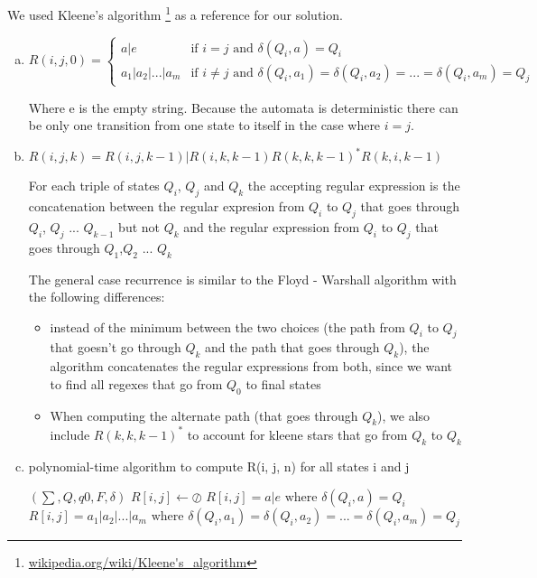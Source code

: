 
We used Kleene's algorithm \footnote{\url{wikipedia.org/wiki/Kleene's_algorithm}} as a reference for our solution.

\begin{enumerate}[(a)]


\item
\[ 
	R(i,j,0) = 
  \begin{cases} 
      a | e & \text{if } i = j \text{ and } \delta(Q_{i}, a) = Q_{i} \\
      a_{1} | a_{2} | ... | a_{m} & \text{if } i \neq j \text{ and } \delta(Q_{i}, a_{1}) = \delta(Q_{i}, a_{2}) = ...  = \delta(Q_{i}, a_{m}) = Q_{j}
   \end{cases}
\]

Where e is the empty string.
Because the automata is deterministic there can be only one transition from one state to itself in the case where $i = j$.

\item 

$R(i,j,k)	= R(i,j,k-1) | R(i, k, k - 1)R(k,k,k-1)^{*}R(k,i,k-1)$

For each triple of states $Q_{i}$, $Q_{j}$ and $Q_{k}$ the accepting regular expression is the concatenation between the regular expresion from $Q_{i}$ to $Q_{j}$ that goes through $Q_{i}$, $Q_{j}$ ... $Q_{k-1}$ but not $Q_{k}$ and the regular expression from $Q_{i}$ to $Q_{j}$ that goes through $Q_{1}$,$Q_{2}$ ... $Q_{k}$

The general case recurrence is similar to the Floyd - Warshall algorithm with the following differences:

\begin{itemize}
	\item instead of the minimum between the two choices (the path from $Q_{i}$ to $Q_{j}$ that goesn't go through $Q_{k}$ and the path that goes through $Q_{k}$), the algorithm concatenates the regular expressions from both, since we want to find all regexes that go from $Q_{0}$ to final states
	\item When computing the alternate path (that goes through $Q_{k}$), we also include $R(k,k,k-1)^{*}$ to account for kleene stars that go from $Q_{k}$ to $Q_{k}$
\end{itemize}

\item

\begin{algorithm}[H]
	\caption{polynomial-time algorithm to compute R(i, j, n) for all states i and j}
	\begin{algorithmic}
	  \Require {}
	  \Require $(\sum, Q, q0, F, \delta)$
				\State $R[i,j] \gets \oslash$ 
					\State $R[i,j]= a | e \text{ where } \delta(Q_{i}, a) = Q_{i} $
				\Else
					 \State $R[i,j] = a_{1} | a_{2} | ... | a_{m}  \text{ where } \delta(Q_{i}, a_{1}) = \delta(Q_{i}, a_{2}) = ...  = \delta(Q_{i}, a_{m}) = Q_{j}$
				\EndIf
			\EndFor
		\EndFor
		

\end{algorithmic}
\end{algorithm}
\end{enumerate}
